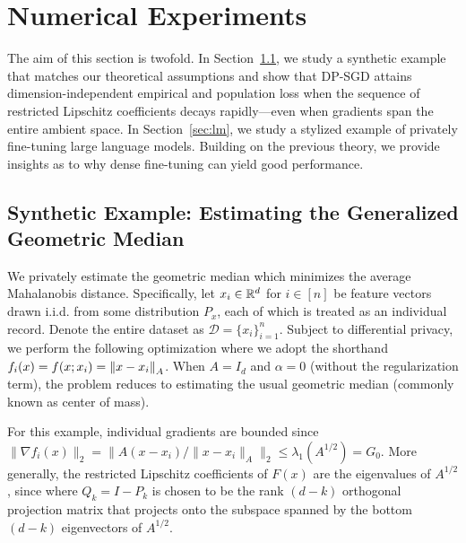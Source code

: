 \section{Numerical Experiments}\label{sec:experiments}
The aim of this section is twofold.
In Section~\ref{sec:synthetic}, we study a synthetic example that matches our theoretical assumptions and show that DP-SGD attains dimension-independent empirical and population loss when the sequence of restricted Lipschitz coefficients decays rapidly---even when gradients span the entire ambient space.
In Section~\ref{sec:lm}, we study a stylized example of privately fine-tuning large language models. 
Building on the previous theory, we provide insights as to why dense fine-tuning can yield good performance. 

\subsection{Synthetic Example: Estimating the Generalized Geometric Median}\label{sec:synthetic}
We privately estimate the geometric median which minimizes the average Mahalanobis distance. 
Specifically, let $x_i \in \mathbb{R}^d$ for $i \in [n]$ be feature vectors drawn i.i.d. from some distribution $P_x$, each of which is treated as an individual record. 
Denote the entire dataset as $\mathcal{D} = \{ x_i\}_{i=1}^n$.
Subject to differential privacy, we perform the following optimization
where we adopt the shorthand $f_i(x) = f(x; x_i) = \left\lVert x - x_i\right\rVert_A$.
When $A = I_d$ and $\alpha=0$ (without the regularization term), the problem reduces to estimating the usual geometric median (commonly known as center of mass). 

For this example, individual gradients are bounded since $\| \nabla f_i( x ) \|_2 = \| A (x - x_i)  / \| x - x_i \|_A \|_2 \le \lambda_1(A^{1/2}) = G_0$.
More generally, the restricted Lipschitz coefficients of $F(x)$ are the eigenvalues of $A^{1/2}$, since 
where $Q_k = I - P_k$ is chosen to be the rank $(d-k)$ orthogonal projection matrix that projects onto the subspace spanned by the bottom $(d-k)$ eigenvectors of $A^{1/2}$.

